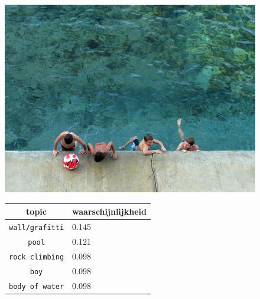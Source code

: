 \begin{figure}[h]
    \centering
    \begin{minipage}[t]{.5\linewidth}
    \centering
    \vspace{0pt}
    \includegraphics[width=\textwidth]{Images/LDA/3283626303.jpg}
    \end{minipage}\hfill
    \begin{minipage}[t]{.5\textwidth}
    \centering
    \vspace{0pt}
    \begin{tabularx}{\textwidth}{cl}
            topic                           & waarschijnlijkheid\\
            \hline
            \texttt{wall/grafitti} & 0.145\\
            \texttt{pool} & 0.121\\
            \texttt{rock climbing} & 0.098\\
            \texttt{boy} & 0.098\\
            \texttt{body of water} & 0.098\\
            \hline
        \end{tabularx}
    \end{minipage}
\end{figure}
